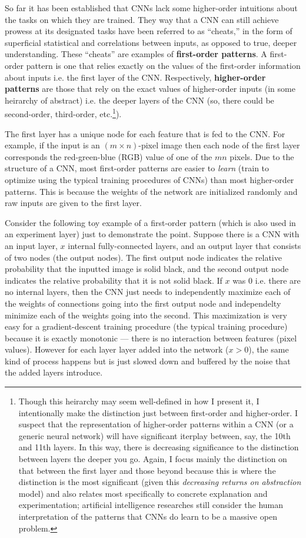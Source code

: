 \documentclass{article}
\renewcommand{\bf}{\textbf}
\renewcommand{\it}{\textit}
\begin{document}
So far it has been established that CNNs lack some higher-order intuitions about the tasks on which they are trained. They way that a CNN can still achieve prowess at its designated tasks have been referred to as ``cheats,'' in the form of superficial statistical and correlations between inputs, as opposed to true, deeper understanding.
These ``cheats'' are examples of \bf{first-order patterns}.
A first-order pattern is one that relies exactly on the values of the first-order information about inputs i.e. the first layer of the CNN.
Respectively, \bf{higher-order patterns} are those that rely on the exact values of higher-order inputs (in some heirarchy of abstract) i.e. the deeper layers of the CNN (so, there could be second-order, third-order, etc.\footnote{Though this heirarchy may seem well-defined in how I present it, I intentionally make the distinction just between first-order and higher-order. I suspect that the representation of higher-order patterns within a CNN (or a generic neural network) will have significant iterplay between, say, the 10th and 11th layers. In this way, there is decreasing significance to the distinction between layers the deeper you go. Again, I focus mainly the distinction on that between the first layer and those beyond because this is where the distinction is the most significant (given this \it{decreasing returns on abstraction} model) and also relates most specifically to concrete explanation and experimentation; artificial intelligence researches still consider the human interpretation of the patterns that CNNs do learn to be a massive open problem.}).

The first layer has a unique node for each feature that is fed to the CNN.
For example, if the input is an $(m \times n)$-pixel image then each node of the first layer corresponds the red-green-blue (RGB) value of one of the $mn$ pixels.
Due to the structure of a CNN, most first-order patterns are easier to \it{learn} (train to optimize using the typical training procedures of CNNs) than most higher-order patterns.
This is because the weights of the network are initialized randomly and raw inputs are given to the first layer.

Consider the following toy example of a first-order pattern (which is also used in an experiment layer) just to demonstrate the point.
Suppose there is a CNN with an input layer, $x$ internal fully-connected layers, and an output layer that consists of two nodes (the output nodes).
The first output node indicates the relative probability that the inputted image is solid black, and the second output node indicates the relative probability that it is not solid black.
If $x$ was $0$ i.e. there are no internal layers, then the CNN just needs to independently maximize each of the weights of connections going into the first output node and independelty minimize each of the weights going into the second.
This maximization is very easy for a gradient-descent training procedure (the typical training procedure) because it is exactly monotonic --- there is no interaction between features (pixel values).
However for each layer layer added into the network ($x > 0$),
the same kind of process happens but is just slowed down and buffered by the noise that the added layers introduce.
\end{document}

